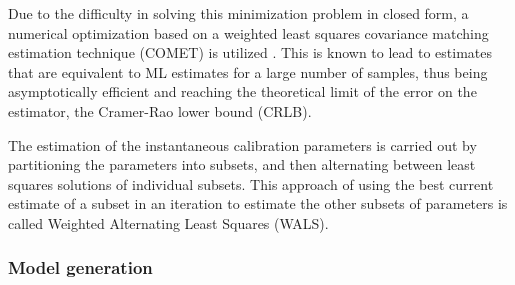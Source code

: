 \documentclass{aa}
\begin{document}
Due to  the difficulty in  solving this minimization  problem in closed  form, a
numerical  optimization based on  a weighted  least squares  covariance matching
estimation technique (COMET)  is utilized \citep{ottersten1998covariance}.  This
is known to  lead to estimates that  are equivalent to ML estimates  for a large
number  of  samples,  thus  being  asymptotically  efficient  and  reaching  the
theoretical  limit of the  error on  the estimator,  the Cramer-Rao  lower bound
(CRLB).

The estimation  of the  instantaneous calibration parameters  is carried  out by
partitioning  the parameters into  subsets, and  then alternating  between least
squares solutions of individual subsets. This approach of using the best current
estimate of a subset in an iteration to estimate the other subsets of parameters
is called Weighted Alternating Least Squares (WALS).


\subsubsection{\label{sub:Model-generation}Model generation}
\end{document}
